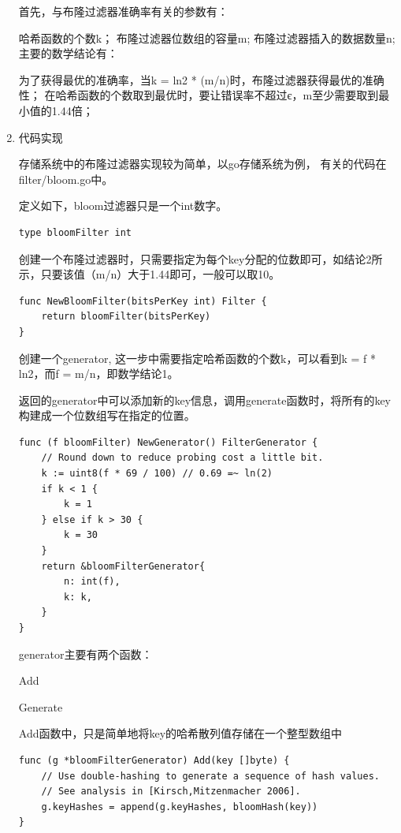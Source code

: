 \begin{enumerate}
首先，与布隆过滤器准确率有关的参数有：

哈希函数的个数k；
布隆过滤器位数组的容量m;
布隆过滤器插入的数据数量n;
主要的数学结论有：

为了获得最优的准确率，当k = ln2 * (m/n)时，布隆过滤器获得最优的准确性；
在哈希函数的个数取到最优时，要让错误率不超过є，m至少需要取到最小值的1.44倍；

			\item 代码实现
			
			存储系统中的布隆过滤器实现较为简单，以go存储系统为例，
			有关的代码在filter/bloom.go中。

定义如下，bloom过滤器只是一个int数字。

\begin{lstlisting}[caption=tFile , label=code_radds_storage_typedef_bloomfilter]
	type bloomFilter int
\end{lstlisting}

创建一个布隆过滤器时，只需要指定为每个key分配的位数即可，如结论2所示，只要该值（m/n）大于1.44即可，一般可以取10。

\begin{lstlisting}[caption=NewBloomFilter , label=code_radds_storage_newbloomfilter]
func NewBloomFilter(bitsPerKey int) Filter {
	return bloomFilter(bitsPerKey)
}
\end{lstlisting}

创建一个generator, 这一步中需要指定哈希函数的个数k，可以看到k = f * ln2，而f = m/n，即数学结论1。

返回的generator中可以添加新的key信息，调用generate函数时，将所有的key构建成一个位数组写在指定的位置。

\begin{lstlisting}[caption=NewGenerator , label=code_radds_storage_NewGenerator]
func (f bloomFilter) NewGenerator() FilterGenerator {
	// Round down to reduce probing cost a little bit.
	k := uint8(f * 69 / 100) // 0.69 =~ ln(2)
	if k < 1 {
		k = 1
	} else if k > 30 {
		k = 30
	}
	return &bloomFilterGenerator{
		n: int(f),
		k: k,
	}
}
\end{lstlisting}

generator主要有两个函数：

Add

Generate

Add函数中，只是简单地将key的哈希散列值存储在一个整型数组中

\begin{lstlisting}[caption=Add , label=code_radds_storage_Add]
func (g *bloomFilterGenerator) Add(key []byte) {
	// Use double-hashing to generate a sequence of hash values.
	// See analysis in [Kirsch,Mitzenmacher 2006].
	g.keyHashes = append(g.keyHashes, bloomHash(key))
}
\end{lstlisting}



\end{enumerate}

